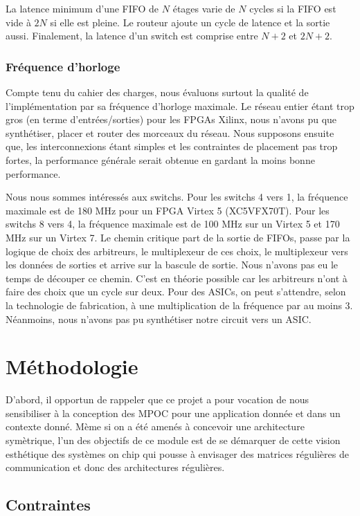 \documentclass[11pt]{article}
\begin{document}
La latence minimum d'une FIFO de $N$ étages varie de $N$ cycles si la FIFO est vide à $2N$ si elle est pleine. Le routeur ajoute un cycle de latence et la sortie aussi. Finalement, la latence d'un switch est comprise entre $N+2$ et $2N+2$.

\subsubsection{Fréquence d'horloge}
Compte tenu du cahier des charges, nous évaluons surtout la qualité de l'implémentation par sa fréquence d'horloge maximale. Le réseau entier étant trop gros (en terme d'entrées/sorties) pour les FPGAs Xilinx, nous n'avons pu que synthétiser, placer et router des morceaux du réseau. Nous supposons ensuite que, les interconnexions étant simples et les contraintes de placement pas trop fortes, la performance générale serait obtenue en gardant la moins bonne performance.

Nous nous sommes intéressés aux switchs. Pour les switchs 4 vers 1, la fréquence maximale est de 180 MHz pour un FPGA Virtex 5 (XC5VFX70T). Pour les switchs 8 vers 4, la fréquence maximale est de 100 MHz sur un Virtex 5 et 170 MHz sur un Virtex 7. Le chemin critique part de la sortie de FIFOs, passe par la logique de choix des arbitreurs, le multiplexeur de ces choix, le multiplexeur vers les données de sorties et arrive sur la bascule de sortie. Nous n'avons pas eu le temps de découper ce chemin. C'est en théorie possible car les arbitreurs n'ont à faire des choix que un cycle sur deux. Pour des ASICs, on peut s'attendre, selon la technologie de fabrication, à une multiplication de la fréquence par au moins 3. Néanmoins, nous n'avons pas pu synthétiser notre circuit vers un ASIC.

\section{Méthodologie}

D'abord, il opportun de rappeler que ce projet a pour vocation de nous sensibiliser à la conception des MPOC pour une application donnée et dans un contexte donné. Mème si on a été amenés à concevoir une architecture symètrique, l'un des objectifs de ce module est de se démarquer de cette vision esthétique des systèmes on chip qui pousse à envisager des matrices régulières de communication et donc des architectures régulières.

\subsection{Contraintes}
\end{document}
